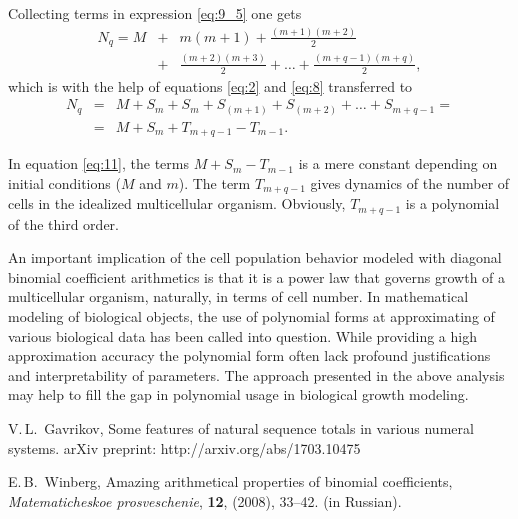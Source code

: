 \documentclass[12pt, twoside, leqno]{article}
\theoremstyle{definition}
\numberwithin{equation}{section}
\begin{document}
Collecting terms in expression \ref{eq:9_5} one gets
\begin{eqnarray}
N_q = M &+& m(m + 1) + \frac{(m + 1)(m + 2)}{2} \label{eq:10} \\
&+& \frac{(m + 2)(m + 3)}{2} + \dots + \frac{(m + q - 1)(m + q)}{2}, \nonumber
\end{eqnarray}
which is with the help of equations \ref{eq:2} and \ref{eq:8} transferred to
\begin{eqnarray}
N_q &=& M + S_m + S_m + S_{(m+1)} + S_{(m + 2)} + \dots + S_{m+q-1} = \label{eq:11} \\
&=& M + S_m + T_{m+q-1} - T_{m-1}. \nonumber
\end{eqnarray}

In equation \ref{eq:11}, the terms $M + S_m - T_{m-1}$ is a mere constant depending on initial conditions ($M$ and $m$). The term $T_{m+q-1}$ gives dynamics of the number of cells in the idealized multicellular organism. Obviously, $T_{m+q-1}$ is a polynomial of the third order.

An important implication of the cell population behavior modeled with diagonal binomial coefficient arithmetics is that it is a power law that governs growth of a multicellular organism, naturally, in terms of cell number. In mathematical modeling of biological objects, the use of polynomial forms at approximating of various biological data has been called into question. While providing a high approximation accuracy the polynomial form often lack profound justifications and interpretability of parameters. The approach presented in the above analysis may help to fill the gap in polynomial usage in biological growth modeling.


\begin{thebibliography}{HD}






\normalsize
\baselineskip=17pt

 V.\,L.~Gavrikov, Some features of natural sequence totals in various numeral systems. arXiv preprint: http://arxiv.org/abs/1703.10475


 E.\,B.~Winberg, Amazing arithmetical properties of binomial coefficients, \textit{Matematicheskoe prosveschenie}, \textbf{12}, (2008), 33--42. (in Russian).

\end{thebibliography}
\end{document}
